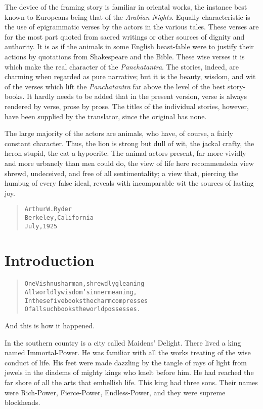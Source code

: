 \documentclass[article, twoside, 14pt]{memoir}
\renewenvironment{verbatim}{%
\begin{quote}%
\vskip -10pt%
\begin{alltt}\normalfont\large}{\end{alltt}%
\end{quote}%
\vskip -10pt
} %
\begin{document}
The device of the framing story is familiar in oriental works, the
instance best known to Europeans being that of the
\emph{Arabian Nights}. Equally characteristic is the use of
epigrammatic verses by the actors in the various tales. These
verses are for the most part quoted from sacred writings or other
sources of dignity and authority. It is as if the animals in some
English beast-fable were to justify their actions by quotations
from Shakespeare and the Bible. These wise verses it is which make
the real character of the \emph{Panchatantra}. The stories, indeed,
are charming when regarded as pure narrative; but it is the beauty,
wisdom, and wit of the verses which lift the \emph{Panchatantra}
far above the level of the best story-books. It hardly needs to be
added that in the present version, verse is always rendered by
verse, prose by prose. The titles of the individual stories,
however, have been supplied by the translator, since the original
has none.

The large majority of the actors are animals, who have, of course,
a fairly constant character. Thus, the lion is strong but dull of
wit, the jackal crafty, the heron stupid, the cat a hypocrite. The
animal actors present, far more vividly and more urbanely than men
could do, the view of life here recommended{\textemdash}a view shrewd,
undeceived, and free of all sentimentality; a view that, piercing
the humbug of every false ideal, reveals with incomparable wit the
sources of lasting joy.

\begin{verbatim}
                            Arthur W. Ryder
                            Berkeley, California
                            July, 1925
\end{verbatim}
\newpage\chapter{Introduction}

\begin{verbatim}
One Vishnusharman, shrewdly gleaning
All worldly wisdom's inner meaning,
In these five books the charm compresses
Of all such books the world possesses.
\end{verbatim}
And this is how it happened.

In the southern country is a city called Maidens' Delight. There
lived a king named Immortal-Power. He was familiar with all the
works treating of the wise conduct of life. His feet were made
dazzling by the tangle of rays of light from jewels in the diadems
of mighty kings who knelt before him. He had reached the far shore
of all the arts that embellish life. This king had three sons.
Their names were Rich-Power, Fierce-Power, Endless-Power, and they
were supreme blockheads.
\end{document}
